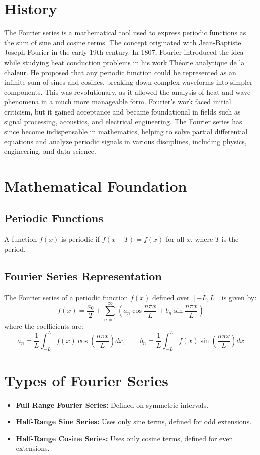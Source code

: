 \documentclass[12pt,a4paper]{article}
\begin{document}
\newpage
\tableofcontents
\newpage

\section{History}
The Fourier series is a mathematical tool used to express periodic functions as the sum of sine and cosine terms. The concept originated with Jean-Baptiste Joseph Fourier in the early 19th century. In 1807, Fourier introduced the idea while studying heat conduction problems in his work Théorie analytique de la chaleur. He proposed that any periodic function could be represented as an infinite sum of sines and cosines, breaking down complex waveforms into simpler components. This was revolutionary, as it allowed the analysis of heat and wave phenomena in a much more manageable form.
Fourier’s work faced initial criticism, but it gained acceptance and became foundational in fields such as signal processing, acoustics, and electrical engineering. The Fourier series has since become indispensable in mathematics, helping to solve partial differential equations and analyze periodic signals in various disciplines, including physics, engineering, and data science.


\section{Mathematical Foundation}
\subsection{Periodic Functions}
A function \( f(x) \) is periodic if \( f(x + T) = f(x) \) for all \( x \), where \( T \) is the period.

\subsection{Fourier Series Representation}
The Fourier series of a periodic function \( f(x) \) defined over \( [-L, L] \) is given by:
\[
f(x) = \frac{a_0}{2} + \sum_{n=1}^{\infty} \left( a_n \cos \frac{n\pi x}{L} + b_n \sin \frac{n\pi x}{L} \right)
\]
where the coefficients are:
\[
a_n = \frac{1}{L} \int_{-L}^{L} f(x) \cos\left( \frac{n\pi x}{L} \right) dx,\quad 
\quad b_n = \frac{1}{L} \int_{-L}^{L} f(x) \sin\left( \frac{n\pi x}{L} \right) dx
\]

\section{Types of Fourier Series}
\begin{itemize}
    \item \textbf{Full Range Fourier Series:} Defined on symmetric intervals.
    \item \textbf{Half-Range Sine Series:} Uses only sine terms, defined for odd extensions.
    \item \textbf{Half-Range Cosine Series:} Uses only cosine terms, defined for even extensions.
\end{itemize}
\end{document}
